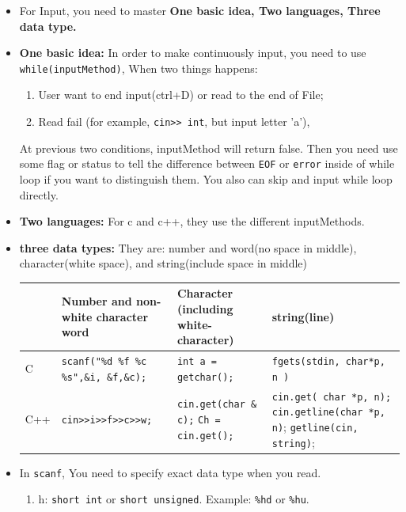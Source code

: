 \documentclass[a4paper,11pt,twoside]{book}
\newcommand{\tophline}{\hline }
\newcommand{\bottomhline}{\\ \hline }
\newcommand{\tophline}{ }
\newcommand{\bottomhline}{ }
\begin{document}
\begin{itemize}
	\item For Input, you need to master \textbf{One basic idea, Two languages, Three data type.}
	\item \textbf{One basic idea:} In order to make continuously input, you need to use \texttt{while(inputMethod)}, When two things happens:
	\begin{enumerate}
		\item User want to end input(ctrl+D) or read to the end of File;
		\item Read fail (for example,  \verb|cin>> int|, but input letter 'a'),
	\end{enumerate}
	
	At previous two conditions, inputMethod will return false.  Then you need use some flag or status to tell the difference between \texttt{EOF} or \texttt{error} inside of while loop if you want to distinguish them. You also can skip and input while loop directly.
	
	\item \textbf{Two languages:} For c and c++, they use the different inputMethods. 
	
	\item \textbf{three data types:} They are: number and word(no space in middle), character(white space), and string(include space in middle)
	
	\begin{tabular}{|p{}|p{}|p{}|p{}|}
		\tophline
		& Number and non-white  character word & Character (including white-character) & string(line)\\
		\tophline
		C &\texttt{scanf("\%d \%f \%c \%s",\&i, \&f,\&c);}  & \texttt{int a = getchar();} & \texttt{fgets(stdin, char*p, n )} \\
		\tophline
		C++ & \verb|cin>>i>>f>>c>>w;| & \texttt{cin.get(char \& c);} \newline  \texttt{Ch = cin.get();} & \texttt{cin.get( char *p, n);} \newline \texttt{cin.getline(char *p, n)}; \newline \texttt{getline(cin, string)};
		\bottomhline
	\end{tabular}
	
	
	\item In \texttt{scanf}, You need to specify exact data type when you read.
	\begin{enumerate}
		\item h:  \texttt{short int} or \texttt{short unsigned}. Example: \texttt{\%hd} or \texttt{\%hu}.
		

\end{enumerate}
\end{itemize}
\end{document}
